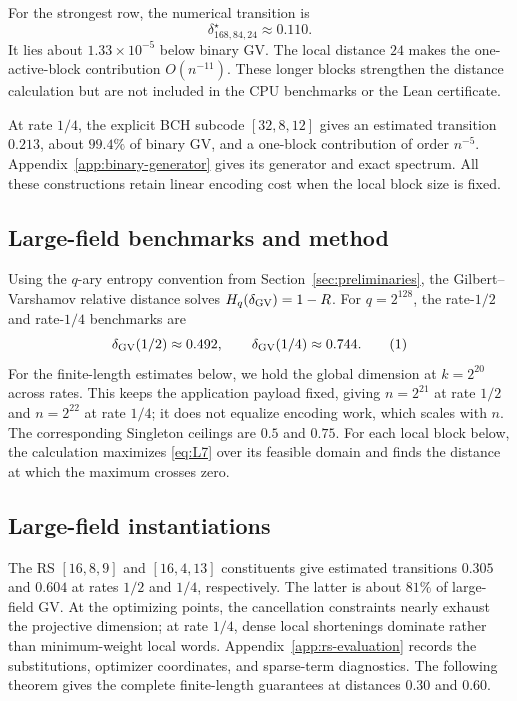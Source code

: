\documentclass[runningheads,envcountsame,envcountsect]{llncs}
\newcommand{\eqnumlabel}[1]{%
  \refstepcounter{equation}\tag{\theequation}\label{#1}%
}
\begin{document}
For the strongest row, the numerical transition is
\[
    \boxed{\delta^\star_{168,84,24}\approx0.110.}
\]
It lies about $1.33\times10^{-5}$ below binary GV.  The local distance $24$
makes the one-active-block contribution $O(n^{-11})$.  These longer blocks
strengthen the distance calculation but are not included in the CPU benchmarks
or the Lean certificate.

At rate $1/4$, the explicit BCH subcode $[32,8,12]$ gives an estimated
transition $0.213$, about $99.4\%$ of binary GV, and a one-block contribution
of order $n^{-5}$.  Appendix~\ref{app:binary-generator} gives its generator
and exact spectrum.  All these constructions retain linear encoding cost
when the local block size is fixed.

\subsection{Large-field benchmarks and method}

Using the $q$-ary entropy convention from Section~\ref{sec:preliminaries}, the
Gilbert--Varshamov relative distance solves
$H_q(\delta_{\rm GV})=1-R$.
For $q=2^{128}$, the rate-$1/2$ and rate-$1/4$ benchmarks are
\[
    \delta_{\rm GV}(1/2)\approx0.492,
    \qquad
    \delta_{\rm GV}(1/4)\approx0.744.
    \eqnumlabel{eq:R2}
\]
For the finite-length estimates below, we hold the global dimension at
$k=2^{20}$ across rates.  This keeps the application payload fixed, giving
$n=2^{21}$ at rate $1/2$ and $n=2^{22}$ at rate $1/4$; it does not equalize
encoding work, which scales with $n$.
The corresponding Singleton ceilings are $0.5$ and $0.75$.  For each local
block below, the calculation maximizes \eqref{eq:L7} over its feasible domain and finds
the distance at which the maximum crosses zero.

\subsection{Large-field instantiations}
The RS $[16,8,9]$ and $[16,4,13]$ constituents give estimated transitions
$0.305$ and $0.604$ at rates $1/2$ and $1/4$, respectively.  The latter is
about $81\%$ of large-field GV.  At the optimizing points, the cancellation
constraints nearly exhaust the projective dimension; at rate $1/4$, dense
local shortenings dominate rather than minimum-weight local words.
Appendix~\ref{app:rs-evaluation} records the substitutions, optimizer
coordinates, and sparse-term diagnostics.  The following theorem gives the
complete finite-length guarantees at distances $0.30$ and $0.60$.
\end{document}
